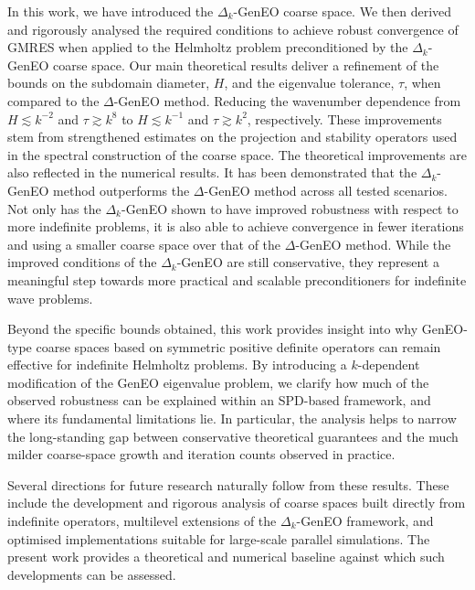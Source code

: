 \documentclass[preprint,3p,times]{elsarticle}
\theoremstyle{definition}
\numberwithin{equation}{section}
\begin{document}
In this work, we have introduced the $\Delta_k$-GenEO coarse space. We then derived and rigorously analysed the required conditions 
to achieve robust convergence of GMRES when applied to the Helmholtz problem preconditioned by the $\Delta_k$-GenEO coarse space. 
Our main theoretical results deliver a refinement of the bounds on the subdomain diameter, $H$, and the eigenvalue tolerance, $\tau$, 
when compared to the $\Delta$-GenEO method.  Reducing the wavenumber dependence from $H \lesssim k^{-2}$ and $\tau \gtrsim k^{8}$ 
to $H \lesssim k^{-1}$ and $\tau \gtrsim k^{2}$, respectively. 
These improvements stem from strengthened estimates on the projection and stability operators used 
in the spectral construction of the coarse space.  The theoretical improvements are also reflected in the numerical results. 
It has been demonstrated that the $\Delta_k$-GenEO method outperforms the $\Delta$-GenEO method across all tested scenarios. 
Not only has the $\Delta_k$-GenEO shown to have improved robustness with respect to more indefinite problems, 
it is also able to achieve convergence in fewer iterations and using a smaller coarse space over that of the $\Delta$-GenEO method. 
While the improved conditions of the $\Delta_k$-GenEO are still conservative, they represent a meaningful step towards 
more practical and scalable preconditioners for indefinite wave problems.     

{Beyond the specific bounds obtained, this work provides insight into why GenEO-type coarse spaces based on 
symmetric positive definite operators can remain effective for indefinite Helmholtz problems. 
By introducing a $k$-dependent modification of the GenEO eigenvalue problem, we clarify how much of the observed robustness 
can be explained within an SPD-based framework, and where its fundamental limitations lie. 
In particular, the analysis helps to narrow the long-standing gap between conservative theoretical guarantees 
and the much milder coarse-space growth and iteration counts observed in practice.}

{Several directions for future research naturally follow from these results. 
These include the development and rigorous analysis of coarse spaces built directly from indefinite operators, 
multilevel extensions of the $\Delta_k$-GenEO framework, and optimised implementations suitable for large-scale parallel simulations. 
The present work provides a theoretical and numerical baseline against which such developments can be assessed.
}





\end{document}
